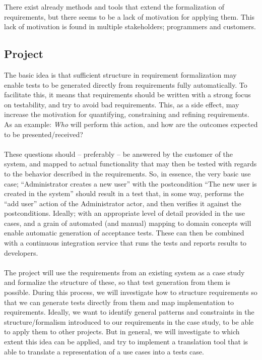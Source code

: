 There exist already methods and tools that extend the formalization of requirements, but there seems to be a lack of motivation for applying them. This lack of motivation is found in multiple stakeholders; programmers and customers.

\subsection{Project}
The basic idea is that sufficient structure in requirement formalization may enable tests to be generated directly from requirements fully automatically. To facilitate this, it means that requirements should be written with a strong focus on testability, and try to avoid bad requirements. This, as a side effect, may increase the motivation for quantifying, constraining and refining requirements. As an example: \emph{Who} will perform this action, and how are the outcomes expected to be presented/received?\\\\
These questions should -- preferably -- be answered by the customer of the system, and mapped to actual functionality that may then be tested with regards to the behavior described in the requirements. So, in essence, the very basic use case; ``Administrator creates a new user'' with the postcondition ``The new user is created in the system'' should result in a test that, in some way, performs the ``add user'' action of the Administrator actor, and then verifies it against the postconditions. Ideally; with an appropriate level of detail provided in the use cases, and a grain of automated (and manual) mapping to domain concepts will enable automatic generation of acceptance tests. These can then be combined with a continuous integration service that runs the tests and reports results to developers.\\\\
The project will use the requirements from an existing system as a case study and formalize the structure of these, so that test generation from them is possible. During this process, we will investigate how to structure requirements so that we can generate tests directly from them and map implementation to requirements. Ideally, we want to identify general patterns and constraints in the structure/formalism introduced to our requirements in the case study, to be able to apply them to other projects. But in general, we will investigate to which extent this idea can be applied, and try to implement a translation tool that is able to translate a representation of a use cases into a tests case.

